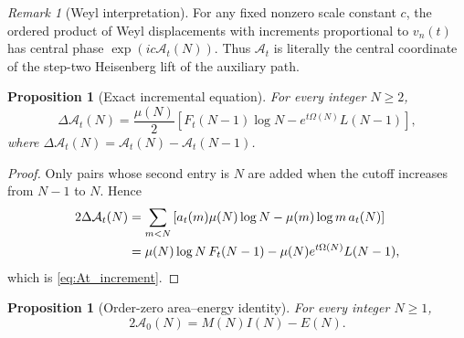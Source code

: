 \documentclass[11pt]{amsart}
\numberwithin{equation}{section}
\theoremstyle{plain}
\newtheorem{proposition}[theorem]{Proposition}
\theoremstyle{definition}
\theoremstyle{remark}
\newtheorem{remark}[theorem]{Remark}
\begin{document}
\begin{remark}[Weyl interpretation]
\label{rem:At_weyl_interpretation}
For any fixed nonzero scale constant \(c\), the ordered product of Weyl
displacements with increments proportional to \(v_n(t)\) has central phase
\(\exp(ic\mathcal A_t(N))\).  Thus \(\mathcal A_t\) is literally the
central coordinate of the step-two Heisenberg lift of the auxiliary path.
\end{remark}

\begin{proposition}[Exact incremental equation]
\label{prop:At_increment}
For every integer \(N\ge2\),
\begin{equation}
\boxed{
\Delta\mathcal A_t(N)
=
\frac{\mu(N)}2
\left[
F_t(N-1)\log N-e^{t\Omega(N)}L(N-1)
\right],}
\label{eq:At_increment}
\end{equation}
where \(\Delta\mathcal A_t(N)=\mathcal A_t(N)-\mathcal A_t(N-1)\).
\end{proposition}

\begin{proof}
Only pairs whose second entry is \(N\) are added when the cutoff increases
from \(N-1\) to \(N\).  Hence
\begin{align}
2\Delta\mathcal A_t(N)
&=
\sum_{m<N}
\left[a_t(m)\mu(N)\log N-\mu(m)\log m\,a_t(N)\right]
\notag\\
&=
\mu(N)\log N\,F_t(N-1)
-\mu(N)e^{t\Omega(N)}L(N-1),
\label{eq:At_increment_proof}
\end{align}
which is \eqref{eq:At_increment}.
\end{proof}

\begin{proposition}[Order-zero area--energy identity]
\label{prop:A0_energy_identity}
For every integer \(N\ge1\),
\begin{equation}
\boxed{
2\mathcal A_0(N)=M(N)I(N)-E(N).}
\label{eq:A0_energy_identity}
\end{equation}
\end{proposition}
\end{document}
